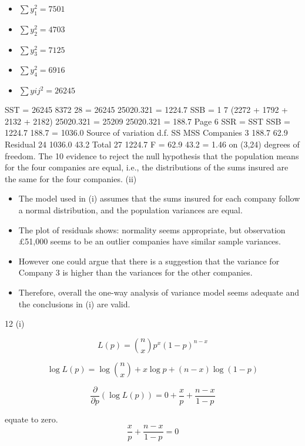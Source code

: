 \documentclass[a4paper,12pt]{article}
\begin{document}
\begin{itemize}
    \item $\sum y_1^2 = 7501$ 
\item $\sum y^2_2 = 4703 $
\item $\sum y_3^2 = 7125 $
\item $\sum y_4^2 = 6916 $
\item $\sum yij^2 = 26245 $
\end{itemize}
SST = 26245
8372
28
= 26245 25020.321 = 1224.7
SSB =
1
7
(2272 + 1792 + 2132 + 2182) 25020.321
= 25209 25020.321 = 188.7
Page 6
SSR = SST SSB = 1224.7 188.7 = 1036.0
Source of variation d.f. SS MSS
Companies 3 188.7 62.9
Residual 24 1036.0 43.2
Total 27 1224.7
F =
62.9
43.2
= 1.46 on (3,24) degrees of freedom.
The 10%
evidence to reject the null hypothesis that the population means for the four
companies are equal, i.e., the distributions of the sums insured are the same for
the four companies.
(ii) 
\begin{itemize}
    \item The model used in (i) assumes that the sums insured for each company follow
a normal distribution, and the population variances are equal.
\item The plot of residuals shows:
normality seems appropriate, but observation £51,000 seems to be an
outlier
companies have similar sample variances. \item However one could argue that there is
a suggestion that the variance for Company 3 is higher than the variances
for the other companies.
\item Therefore, overall the one-way analysis of variance model seems adequate and
the conclusions in (i) are valid.
\end{itemize}

12 (i) %


\[L ( p ) = {n \choose x} p^x (1-p)^{n-x}\]

\[ \log L ( p )  = \log {n \choose x} + x \log p + (n-x) \log(1-p)\]

\[ \frac{\partial}{\partial p} \left( \log L ( p ) \right)  =  0 +  \frac{x}{p} +  \frac{n-x}{1-p} \]


equate to zero. \[ \frac{x}{p} +  \frac{n-x}{1-p} = 0\]
\end{document}
